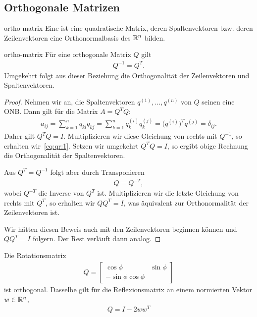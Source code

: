 \subsection{Orthogonale Matrizen}

\begin{Definition}{ortho-matrix}
  Eine  ist eine quadratische Matrix, deren
  Spaltenvektoren bzw. deren Zeilenvektoren eine Orthonormalbasis des
  $\mathbb R^n$ bilden.
\end{Definition}

\begin{Satz}{ortho-matrix}
  Für eine orthogonale Matrix $Q$ gilt
  \begin{gather}
    \label{eq:qr:1}
    Q^{-1} = Q^T.
  \end{gather}
  Umgekehrt folgt aus dieser Beziehung die Orthogonalität der
  Zeilenvektoren und Spaltenvektoren.
\end{Satz}

\begin{proof}
  Nehmen wir an, die Spaltenvektoren $q^{(1)},\dots,q^{(n)}$ von $Q$
  seinen eine ONB. Dann gilt für die Matrix $A = Q^TQ$:
  \begin{gather}
    a_{ij} = \sum_{k=1}^n q_{ki}q_{kj}
    = \sum_{k=1}^n q^{(i)}_k q^{(j)}_k
    = \bigl(q^{(i)}\bigr)^T q^{(j)} = \delta_{ij}.
  \end{gather}
  Daher gilt $Q^TQ=I$.  Multiplizieren wir diese Gleichung von rechts
  mit $Q^{-1}$, so erhalten wir~\eqref{eq:qr:1}. Setzen wir umgekehrt
  $Q^TQ=I$, so ergibt obige Rechnung die Orthogonalität der
  Spaltenvektoren.

  Aus $Q^T = Q^{-1}$ folgt aber durch Transponieren
  \begin{gather}
    Q = Q^{-T},
  \end{gather}
  wobei $Q^{-T}$ die Inverse von $Q^T$ ist. Multiplizieren wir die
  letzte Gleichung von rechts mit $Q^T$, so erhalten wir $QQ^T = I$,
  was äquivalent zur Orthonormalität der Zeilenvektoren ist.

  Wir hätten diesen Beweis auch mit den Zeilenvektoren beginnen können
  und $QQ^T=I$ folgern. Der Rest verläuft dann analog.
\end{proof}

\begin{example}
  Die Rotationsmatrix
  \begin{gather}
    Q = \begin{bmatrix}
      \cos \phi & \sin \phi\\-\sin\phi\cos\phi
    \end{bmatrix}
  \end{gather}
  ist orthogonal. Dasselbe gilt für die Reflexionsmatrix an einem
  normierten Vektor $w\in \mathbb R^n$,
  \begin{gather}
    Q = I-2ww^T
  \end{gather}
\end{example}

